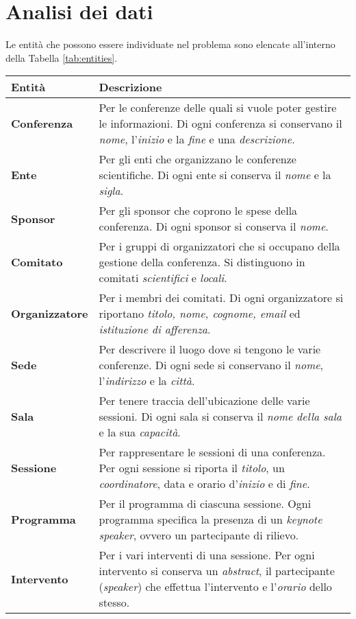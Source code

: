 \section{Analisi dei dati}\label{concetti}
Le entità che possono essere individuate nel problema sono elencate all'interno della Tabella \ref{tab:entities}.
\begin{table}[h!]
\begin{tabularx}{\textwidth}{|l|X|}
\hline
\textbf{Entità} & \textbf{Descrizione} \\
\hline
\textbf{Conferenza} & Per le conferenze delle quali si vuole poter gestire le informazioni. Di ogni conferenza si conservano il \textit{nome}, l'\textit{inizio} e la \textit{fine} e una \textit{descrizione}. \\ \hline
\textbf{Ente} & Per gli enti che organizzano le conferenze scientifiche. Di ogni ente si conserva il \textit{nome} e la \textit{sigla}. \\ \hline
\textbf{Sponsor} & Per gli sponsor che coprono le spese della conferenza. Di ogni sponsor si conserva il \textit{nome}.\\ \hline
\textbf{Comitato} & Per i gruppi di organizzatori che si occupano della gestione della conferenza. Si distinguono in comitati \textit{scientifici} e \textit{locali}. \\ \hline
\textbf{Organizzatore} & Per i membri dei comitati. Di ogni organizzatore si riportano \textit{titolo, nome, cognome, email} ed \textit{istituzione di afferenza}. \\ \hline
\textbf{Sede} & Per descrivere il luogo dove si tengono le varie conferenze. Di ogni sede si conservano il \textit{nome}, l'\textit{indirizzo} e la \textit{città}.\\ \hline
\textbf{Sala} & Per tenere traccia dell'ubicazione delle varie sessioni. Di ogni sala si conserva il \textit{nome della sala} e la sua \textit{capacità}. \\ \hline
\textbf{Sessione} & Per rappresentare le sessioni di una conferenza. Per ogni sessione si riporta il \textit{titolo}, un \textit{coordinatore}, data e orario d'\textit{inizio} e di \textit{fine}. \\ \hline
\textbf{Programma} & Per il programma di ciascuna sessione. Ogni programma specifica la presenza di un \textit{keynote speaker}, ovvero un partecipante di rilievo. \\ \hline
\textbf{Intervento} & Per i vari interventi di una sessione. Per ogni intervento si conserva un \textit{abstract}, il partecipante (\textit{speaker}) che effettua l'intervento e l'\textit{orario} dello stesso. \\ \hline

\end{tabularx}
\end{table}
